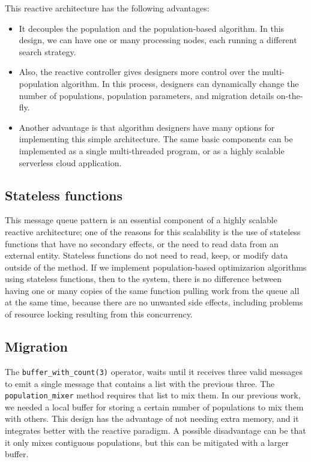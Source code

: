 This reactive architecture has the following advantages:
\begin{itemize}

\item It decouples the population and the population-based algorithm. In this
design, we can have one or many processing nodes, each running a different
search strategy.

\item Also, the reactive controller gives designers more control over the
multi-population algorithm. In this process, designers can dynamically change
the number of populations, population parameters, and migration details
on-the-fly.

\item Another advantage is that algorithm designers have many options for
implementing this simple architecture. The same basic components can be
implemented as a single multi-threaded program, or as a highly scalable
serverless cloud application.
\end{itemize}

\subsection{Stateless functions} 
\label{functions} 

This message queue pattern is an essential component of a highly scalable
reactive architecture; one of the reasons for this scalability is the use of
stateless functions that have no secondary effects, or the need to read data
from an external entity. Stateless functions do not need to read, keep, or
modify data outside of the method. If we implement population-based
optimizarion algorithms using stateless functions, then to the system, there is
no difference between having one or many copies of the same function pulling
work from the queue all at the same time, because there are no unwanted side
effects, including problems of resource locking resulting from this
concurrency.

\subsection{Migration}
\label{migration}

The   \texttt{buffer\_with\_count(3)} operator, waits until it receives 
three valid messages to emit a single message that contains a list with
the previous three. The \texttt{population\_mixer}  method requires that list to mix them. 
In our previous work, we needed a local buffer for storing a certain 
number of populations to mix them with others. This design has the advantage
of not needing extra memory, and it integrates better with the reactive paradigm.
A possible disadvantage can be that it only mixes contiguous populations,
but this can be mitigated with a larger buffer.

